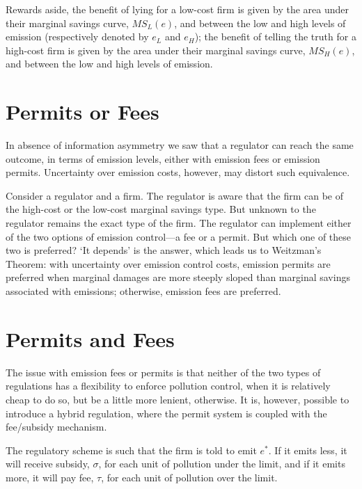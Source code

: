 \documentclass[
]{book}
\begin{document}
Rewards aside, the benefit of lying for a low-cost firm is given by the area under their marginal savings curve, \(MS_L(e)\), and between the low and high levels of emission (respectively denoted by \(e_L\) and \(e_H\)); the benefit of telling the truth for a high-cost firm is given by the area under their marginal savings curve, \(MS_H(e)\), and between the low and high levels of emission.

\hypertarget{permits-or-fees}{%
\section{Permits or Fees}\label{permits-or-fees}}

In absence of information asymmetry we saw that a regulator can reach the same outcome, in terms of emission levels, either with emission fees or emission permits. Uncertainty over emission costs, however, may distort such equivalence.

Consider a regulator and a firm. The regulator is aware that the firm can be of the high-cost or the low-cost marginal savings type. But unknown to the regulator remains the exact type of the firm. The regulator can implement either of the two options of emission control---a fee or a permit. But which one of these two is preferred? `It depends' is the answer, which leads us to Weitzman's Theorem: with uncertainty over emission control costs, emission permits are preferred when marginal damages are more steeply sloped than marginal savings associated with emissions; otherwise, emission fees are preferred.

\hypertarget{permits-and-fees}{%
\section{Permits and Fees}\label{permits-and-fees}}

The issue with emission fees or permits is that neither of the two types of regulations has a flexibility to enforce pollution control, when it is relatively cheap to do so, but be a little more lenient, otherwise. It is, however, possible to introduce a hybrid regulation, where the permit system is coupled with the fee/subsidy mechanism.

The regulatory scheme is such that the firm is told to emit \(e^*\). If it emits less, it will receive subsidy, \(\sigma\), for each unit of pollution under the limit, and if it emits more, it will pay fee, \(\tau\), for each unit of pollution over the limit.
\end{document}
